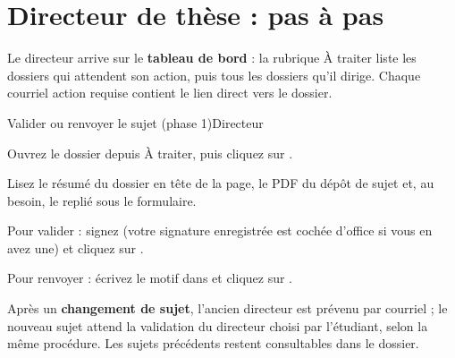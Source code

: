 \documentclass[11pt,a4paper]{article}
\begin{document}


\section{Directeur de thèse : pas à pas}

Le directeur arrive sur le \textbf{tableau de bord} : la rubrique \og À
traiter\fg{} liste les dossiers qui attendent son action, puis tous les dossiers
qu'il dirige. Chaque courriel \og action requise\fg{} contient le lien direct
vers le dossier.


\begin{procedure}{Valider ou renvoyer le sujet (phase 1)}{Directeur}
\begin{etapes}
  \item Ouvrez le dossier depuis \og À traiter\fg{}, puis cliquez sur
        .
  \item Lisez le résumé du dossier en tête de la page, le PDF du dépôt de sujet
        et, au besoin, le  replié sous le formulaire.
  \item Pour valider : signez (votre signature enregistrée est cochée d'office
        si vous en avez une) et cliquez sur .
  \item Pour renvoyer : écrivez le motif dans  et cliquez
        sur .
\end{etapes}
\end{procedure}


\begin{astuce}
Après un \textbf{changement de sujet}, l'ancien directeur est prévenu par
courriel ; le nouveau sujet attend la validation du directeur choisi par
l'étudiant, selon la même procédure. Les sujets précédents restent consultables
dans le dossier.
\end{astuce}
\end{document}
